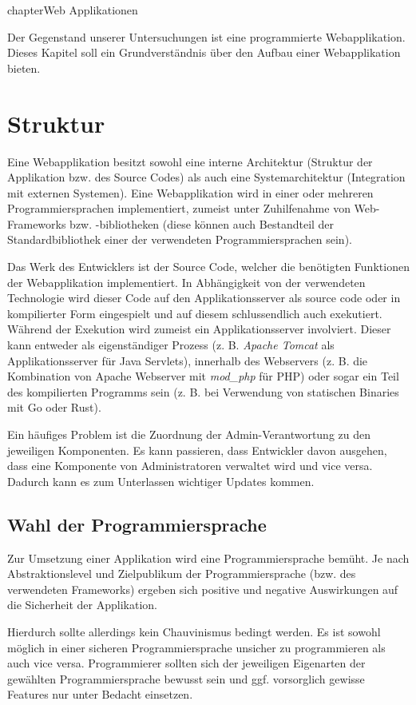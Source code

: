 chapter{Web Applikationen}

Der Gegenstand unserer Untersuchungen ist eine programmierte Webapplikation. Dieses Kapitel soll ein Grundverständnis über den Aufbau einer Webapplikation bieten.

\section{Struktur}

Eine Webapplikation besitzt sowohl eine interne Architektur (Struktur der Applikation bzw. des Source Codes) als auch eine Systemarchitektur (Integration mit externen Systemen). Eine Webapplikation wird in einer oder mehreren Programmiersprachen implementiert, zumeist unter Zuhilfenahme von Web-Frameworks bzw. -bibliotheken (diese können auch Bestandteil der Standardbibliothek einer der verwendeten Programmiersprachen sein).

Das Werk des Entwicklers ist der Source Code, welcher die benötigten Funktionen der Webapplikation implementiert. In Abhängigkeit von der verwendeten Technologie wird dieser Code auf den Applikationsserver als source code oder in kompilierter Form eingespielt und auf diesem schlussendlich auch exekutiert. Während der Exekution wird zumeist ein Applikationsserver involviert. Dieser kann entweder als eigenständiger Prozess (z. B. \textit{Apache Tomcat} als Applikationsserver für Java Servlets), innerhalb des Webservers (z. B. die Kombination von Apache Webserver mit \textit{mod\_php} für PHP) oder sogar ein Teil des kompilierten Programms sein (z. B. bei Verwendung von statischen Binaries mit Go oder Rust).

Ein häufiges Problem ist die Zuordnung der Admin-Verantwortung zu den jeweiligen Komponenten. Es kann passieren, dass Entwickler davon ausgehen, dass eine Komponente von Administratoren verwaltet wird und vice versa. Dadurch kann es zum Unterlassen wichtiger Updates kommen.

\subsection{Wahl der Programmiersprache}

Zur Umsetzung einer Applikation wird eine Programmiersprache bemüht. Je nach Abstraktionslevel und Zielpublikum der Programmiersprache (bzw. des verwendeten Frameworks) ergeben sich positive und negative Auswirkungen auf die Sicherheit der Applikation.

Hierdurch sollte allerdings kein Chauvinismus bedingt werden. Es ist sowohl möglich in einer sicheren Programmiersprache unsicher zu programmieren als auch vice versa. Programmierer sollten sich der jeweiligen Eigenarten der gewählten Programmiersprache bewusst sein und ggf. vorsorglich gewisse Features nur unter Bedacht einsetzen.

